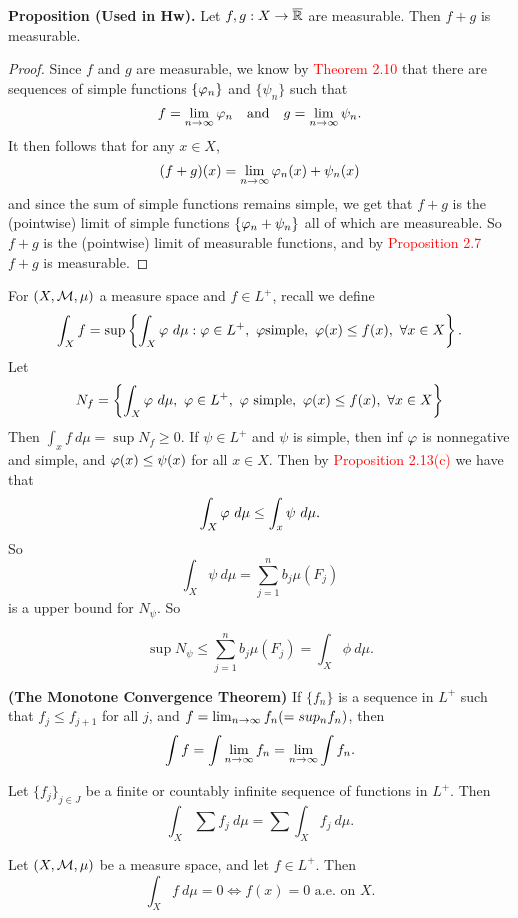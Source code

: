 \textbf{Proposition (Used in Hw).} Let $f,g:X\rightarrow \overline{\mathbb{R}}$ are measurable. Then $f + g$ is measurable. 

\begin{proof} Since $f$ and $g$ are measurable, we know by \textcolor{red}{Theorem 2.10} that there are sequences of simple functions $\{\varphi_n\}$ and $\{\psi_n\}$ such that 
\[f = \lim_{n\rightarrow\infty} \varphi_n\quad\text{and}\quad g = \lim_{n\rightarrow\infty} \psi_n.\]
It then follows that for any $x\in X$, 
\[(f + g)(x) = \lim_{n\rightarrow\infty} \varphi_n(x) + \psi_n(x)\]
and since the sum of simple functions remains simple, we get that $f + g$ is the (pointwise) limit of simple functions $\{\varphi_n + \psi_n\}$ all of which are measureable. So $f + g$ is the (pointwise) limit of measurable functions, and by \textcolor{red}{Proposition 2.7} $f + g$ is measurable.
\end{proof}

\vs

\dfn For $(X, \mathcal{M}, \mu)$ a measure space and $f\in L^+$, recall we define 
\[\int_X f = \sup\left\{\int_X\vphi\ d\mu : \vphi\in L^+,\  \vphi \text{simple},\ \vphi(x) \leq f(x),\  \forall x\in X\right\}.\]
Let
\[N_f = \left\{ \int_X\vphi\ d\mu,\ \vphi \in L^+,\ \vphi\text{ simple},\ \vphi(x)\leq f(x),\ \forall x\in X\right\}\]
Then $\int_x f\ d\mu = \sup N_f\geq 0$. If $\psi\in L^+$ and $\psi$ is simple, then inf $\varphi$ is nonnegative and simple, and $\varphi(x) \leq \psi(x)$ for all $x\in X$. Then by \textcolor{red}{Proposition 2.13(c)} we have that 
\[\int_X\vphi\ d\mu \leq \int_x\psi\ d\mu.\]
So 
\[\int_X\psi\ d\mu = \sum_{j = 1}^n b_j \mu(F_j)\]
is a upper bound for $N_\psi$. So

\[\sup N_\psi \leq \sum_{j = 1}^n b_j\mu(F_j) = \int_X\phi\ d\mu.\]
\begin{thm}\textbf{(The Monotone Convergence Theorem)}
If $\{f_n\}$ is a sequence in $L^+$ such that $f_j \leq f_{j + 1}$ for all $j$, and $f = \lim_{n\rightarrow \infty} f_n (=sup_n f_n)$, then 
\[\int f = \int\lim_{n\rightarrow\infty} f_n = \lim_{n\rightarrow \infty}\int f_n.\]
\end{thm}


\vs

\begin{thm}
Let $\{f_j\}_{j \in J}$ be a finite or countably infinite sequence of functions in $L^+$. Then 
\[\int_X\sum f_j\ d\mu = \sum \int_X f_j\ d\mu.\]
\end{thm} 

\vs

\begin{prop}
Let $(X, \mathcal{M}, \mu)$ be a measure space, and let $f\in L^+$. Then
\[\int_X f\ d\mu = 0 \Leftrightarrow f(x) = 0\text{ a.e. on $X$.}\]
\end{prop}

